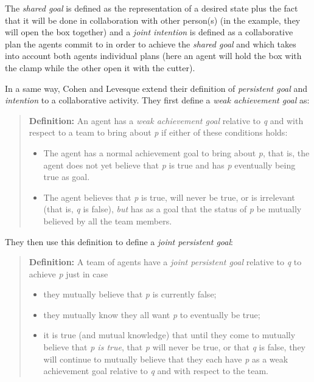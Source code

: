 \documentclass[english,a4paper,11pt,twoside]{StyleThese}
\begin{document}
The \textit{shared goal} is defined as the representation of a desired state plus the fact that it will be done in collaboration with other person(s) (in the example, they will open the box together) and a \textit{joint intention} is defined as a collaborative plan the agents commit to in order to achieve the \textit{shared goal} and which takes into account both agents individual plans (here an agent will hold the box with the clamp while the other open it with the cutter).

In a same way, Cohen and Levesque extend their definition of \textit{persistent goal} and \textit{intention} to a collaborative activity. They first define a \textit{weak achievement goal} as:
\begin{quote}
\textbf{Definition: } An agent has a \textit{weak achievement goal} relative to \textit{q} and with respect to a team to bring about \textit{p} if either of these conditions holds:
\begin{itemize}
\item The agent has a normal achievement goal to bring about \textit{p}, that is, the agent does not yet believe that \textit{p} is true and has \textit{p} eventually being true as goal.
\item The agent believes that \textit{p} is true, will never be true, or is irrelevant (that is, \textit{q} is false), \textit{but} has as a goal that the status of \textit{p} be mutually believed by all the team members.
\end{itemize}
\end{quote}

They then use this definition to define a \textit{joint persistent goal}:
\begin{quote}
\textbf{Definition: } A team of agents have a \textit{joint persistent goal} relative to \textit{q} to achieve \textit{p} just in case
\begin{itemize}
\item they mutually believe that \textit{p} is currently false;
\item they mutually know they all want \textit{p} to eventually be true;
\item it is true (and mutual knowledge) that until they come to mutually believe that \textit{p is true}, that \textit{p} will never be true, or that \textit{q} is false, they will continue to mutually believe that they each have \textit{p} as a weak achievement goal relative to \textit{q} and with respect to the team.
\end{itemize}
\end{quote}
\end{document}
